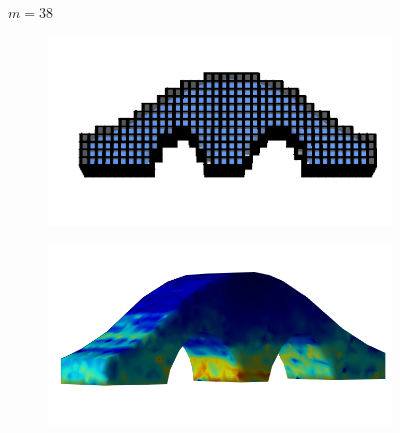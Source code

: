 \documentclass[11pt,titlepage]{article}
\begin{document}
\begin{figure}[!htbp]
        \begin{center}
        $m=38$
        \quad
        \begin{subfigure}[b]{0.4\textwidth}
            \centering
            \includegraphics[width=\textwidth]{hex/resized/archbridge_cage_4}
        \end{subfigure}
        \begin{subfigure}[b]{0.35\textwidth}
            \centering
            \includegraphics[width=\textwidth]{hex/resized/archbridge_4}
        \end{subfigure}
    \end{center}


\end{figure}
\end{document}
